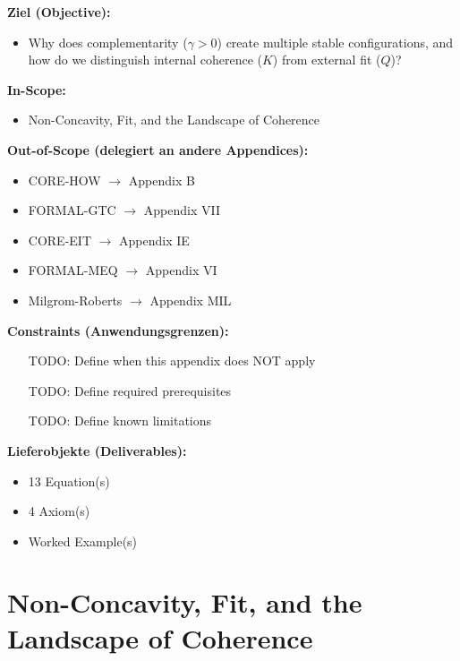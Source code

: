 \begin{tcolorbox}[
    colback=orange!5!white,
    colframe=orange!75!black,
    title={\textbf{Appendix Scope: Ziel / In-Scope / Out-of-Scope / Constraints}},
    fonttitle=\bfseries
]

\textbf{Ziel (Objective):}
\begin{itemize}[nosep]
    \item Why does complementarity ($\gamma > 0$) create multiple stable configurations, and how do we distinguish internal coherence ($K$) from external fit ($Q$)?
\end{itemize}

\textbf{In-Scope:}
\begin{itemize}[nosep]
    \item Non-Concavity, Fit, and the Landscape of Coherence
\end{itemize}

\textbf{Out-of-Scope (delegiert an andere Appendices):}
\begin{itemize}[nosep]
    \item CORE-HOW $\rightarrow$ Appendix B
    \item FORMAL-GTC $\rightarrow$ Appendix VII
    \item CORE-EIT $\rightarrow$ Appendix IE
    \item FORMAL-MEQ $\rightarrow$ Appendix VI
    \item Milgrom-Roberts $\rightarrow$ Appendix MIL
\end{itemize}

\textbf{Constraints (Anwendungsgrenzen):}
\begin{itemize}[nosep]
    \item [TODO: Define when this appendix does NOT apply]
    \item [TODO: Define required prerequisites]
    \item [TODO: Define known limitations]
\end{itemize}

\textbf{Lieferobjekte (Deliverables):}
\begin{itemize}[nosep]
    \item 13 Equation(s)
    \item 4 Axiom(s)
    \item Worked Example(s)
\end{itemize}

\end{tcolorbox}


\section{Non-Concavity, Fit, and the Landscape of Coherence}
\label{app:formal-nc}

